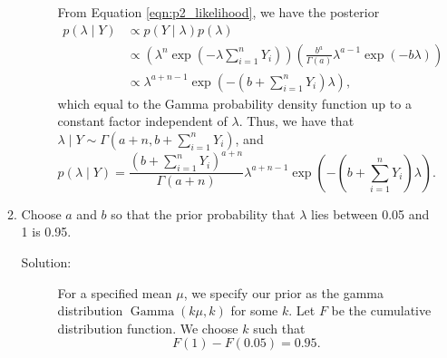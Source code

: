 \documentclass[letterpaper,11pt]{article}
\begin{document}
\begin{enumerate}
\begin{enumerate}
\begin{description}
        From Equation \ref{eqn:p2_likelihood}, we have the posterior
        \begin{align}
          p\left(\lambda \mid Y\right)
          &\propto p\left(Y\mid\lambda\right)p\left(\lambda\right) \nonumber\\
          &\propto \left(
            \lambda^n\exp\left(
            -\lambda\sum_{i=1}^nY_i
            \right)
            \right)
            \left(
            \frac{b^a}{\Gamma(a)}\lambda^{a - 1}\exp\left(-b\lambda\right)
            \right) \nonumber\\
          &\propto \lambda^{a + n - 1}\exp\left(
            -\left(b + \sum_{i=1}^nY_i\right)\lambda
            \right),
            \label{eqn:p2_posterior_propto}
        \end{align}
        which equal to the Gamma probability density function up to a constant
        factor independent of $\lambda$. Thus, we have that $\lambda \mid Y \sim
        \Gamma\left(a + n, b + \sum_{i=1}^nY_i\right)$, and
        \begin{equation}
          p\left(\lambda \mid Y \right)
          = \frac{\left(b + \sum_{i=1}^nY_i\right)^{a+n}}{\Gamma\left(a + n\right)}
          \lambda^{a + n - 1}\exp\left(-\left(b + \sum_{i=1}^nY_i\right)\lambda\right).
          \label{eqn:p2_posterior}
        \end{equation}
      \end{description}
    \item Choose $a$ and $b$ so that the prior probability that $\lambda$ lies
      between 0.05 and 1 is 0.95.
      \label{part:p2_prior}
      \begin{description}
      \item[Solution:] For a specified mean $\mu$, we specify our prior as the
        gamma distribution $\operatorname{Gamma}\left(k\mu,k\right)$ for some
        $k$. Let $F$ be the cumulative distribution function. We choose $k$ such
        that
        \begin{equation}
          F\left(1\right) - F\left(0.05\right) = 0.95.
          \label{eqn:p2_hyperparameter_equation}
        \end{equation}


\end{description}
\end{enumerate}
\end{enumerate}
\end{document}
